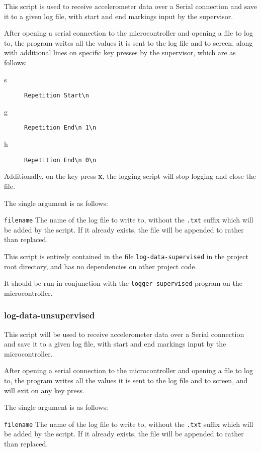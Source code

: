 \documentclass[a4paper]{article}
\begin{document}
This script is used to receive accelerometer data over a Serial connection and save it to a given log file, with start and end markings input by the supervisor.

After opening a serial connection to the microcontroller and opening a file to log to, the program writes all the values it is sent to the log file and to screen, along with additional lines on specific key presses by the supervisor, which are as follows:

\begin{description}
\item[s] \lstinline|Repetition Start\n|
\item[g] \lstinline|Repetition End\n 1\n|
\item[h] \lstinline|Repetition End\n 0\n|
\end{description}

Additionally, on the key press \textbf{x}, the logging script will stop logging and close the file.

The single argument is as follows:

\lstinline{filename} The name of the log file to write to, without the \lstinline{.txt} suffix which will be added by the script. If it already exists, the file will be appended to rather than replaced.

This script is entirely contained in the file \lstinline{log-data-supervised} in the project root directory, and has no dependencies on other project code.

It should be run in conjunction with the \lstinline{logger-supervised} program on the microcontroller.

\subsubsection{log-data-unsupervised}
\label{subsubsec:dc_csa_logunsupervised}

This script will be used to receive accelerometer data over a Serial connection and save it to a given log file, with start and end markings input by the microcontroller.

After opening a serial connection to the microcontroller and opening a file to log to, the program writes all the values it is sent to the log file and to screen, and will exit on any key press.

The single argument is as follows:

\lstinline{filename} The name of the log file to write to, without the \lstinline{.txt} suffix which will be added by the script. If it already exists, the file will be appended to rather than replaced.
\end{document}
